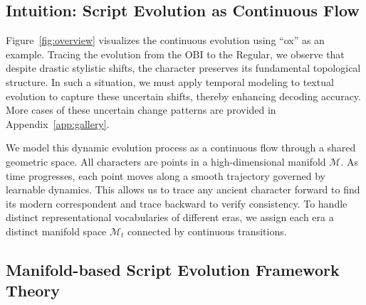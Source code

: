 \documentclass{article}
\newcommand{\cg}[1]{\begin{CJK*}{UTF8}{gbsn}#1\end{CJK*}}
\begin{document}
\subsection{Intuition: Script Evolution as Continuous Flow}
\label{sec:intuition}
Figure~\ref{fig:overview} visualizes the continuous evolution using ``ox'' as an example. Tracing the evolution from the OBI to the Regular, we observe that despite drastic stylistic shifts, the character preserves its fundamental topological structure. In such a situation, we must apply temporal modeling to textual evolution to capture these uncertain shifts, thereby enhancing decoding accuracy. More cases of these uncertain change patterns are provided in Appendix~\ref{app:gallery}.

We model this dynamic evolution process as a continuous flow through a shared geometric space. All characters are points in a high-dimensional manifold $\mathcal{M}$. As time progresses, each point moves along a smooth trajectory governed by learnable dynamics. This allows us to trace any ancient character forward to find its modern correspondent and trace backward to verify consistency. To handle distinct representational vocabularies of different eras, we assign each era a distinct manifold space $\mathcal{M}_t$ connected by continuous transitions.

% 

\subsection{Manifold-based Script Evolution Framework Theory}
\label{sec:framework_theory}
\end{document}
